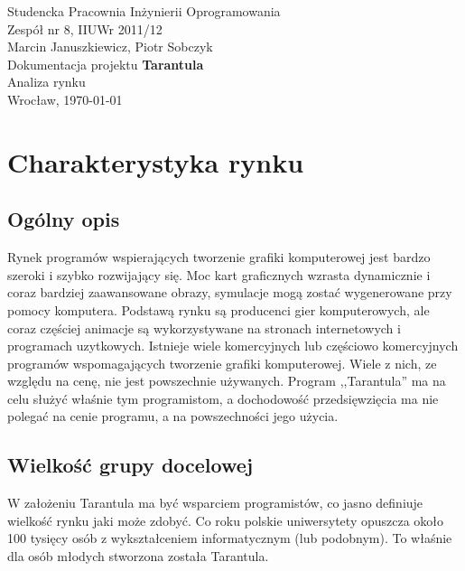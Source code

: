 \documentclass[11pt,leqno]{article}
\begin{document}
\begin{center}
\thispagestyle{empty}
{\Large Studencka Pracownia Inżynierii Oprogramowania}\\[0.5cm]
{\Large Zespół nr 8, IIUWr 2011/12}\\[2.5cm]

{Marcin Januszkiewicz, Piotr Sobczyk}\\[0.5cm]
{\huge Dokumentacja projektu \textbf{Tarantula}}\\[0.25cm]
{ Analiza rynku}\\[0.5cm]
\vfill
{\large Wrocław, \today}
\end{center}

\newpage
\tableofcontents
\newpage
\pagestyle{headings}

\section{Charakterystyka rynku}

\subsection{Ogólny opis}
Rynek programów wspierających tworzenie grafiki komputerowej jest bardzo szeroki i szybko rozwijający się. Moc kart graficznych wzrasta dynamicznie i coraz
bardziej zaawansowane obrazy, symulacje mogą zostać wygenerowane przy pomocy komputera. Podstawą rynku są producenci gier komputerowych, ale coraz częściej
animacje są wykorzystywane na stronach internetowych i programach uzytkowych.
Istnieje wiele komercyjnych lub częściowo komercyjnych programów wspomagających tworzenie grafiki komputerowej. Wiele z nich, ze względu na cenę, 
nie jest powszechnie używanych. Program ,,Tarantula'' ma na celu służyć właśnie tym programistom, a dochodowość przedsięwzięcia ma nie polegać na cenie
programu, a na powszechności jego użycia.

\subsection{Wielkość grupy docelowej}
W założeniu Tarantula ma być wsparciem programistów, co jasno definiuje wielkość rynku jaki może zdobyć. Co roku polskie uniwersytety opuszcza około
100 tysięcy osób z wykształceniem informatycznym (lub podobnym). To właśnie dla osób młodych stworzona została Tarantula.
\end{document}
